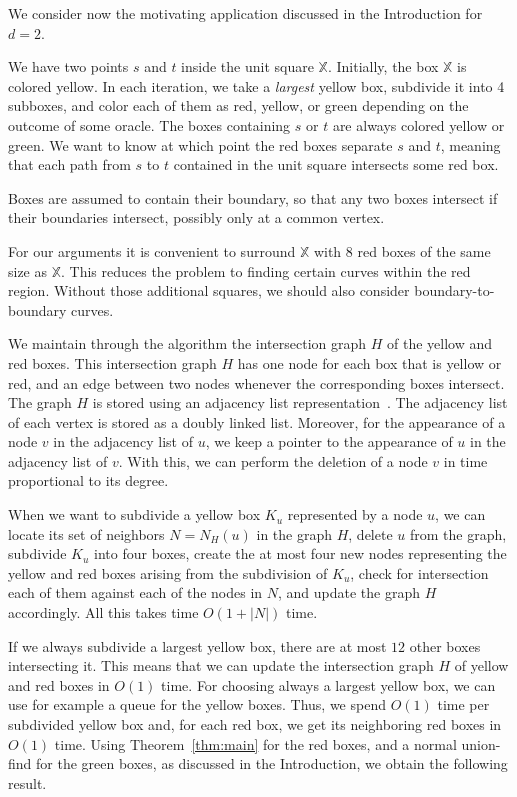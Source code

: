 \documentclass[a4paper,11pt]{article}
\newcommand{\configspace}{\mathbb{X}}
\begin{document}
We consider now the motivating application discussed in the Introduction for $d=2$.

We have two points $s$ and $t$ inside the unit square $\configspace$.
Initially, the box $\configspace$ is colored yellow.
In each iteration, we take a \emph{largest} yellow box, subdivide it into
4 subboxes, and color each of them as red, yellow, or green 
depending on the outcome of some oracle.
The boxes containing $s$ or $t$ are always colored yellow or green.
We want to know at which point the red boxes separate $s$ and $t$, meaning
that each path from $s$ to $t$ contained in the unit square 
intersects some red box. 

Boxes are assumed to contain their boundary, 
so that any two boxes intersect if their boundaries intersect, 
possibly only at a common vertex.

For our arguments it is convenient to surround $\configspace$ with 8 red boxes of the same size
as $\configspace$. This reduces the problem to finding certain
curves within the red region. Without those additional squares, we should also consider 
boundary-to-boundary curves.

We maintain through the algorithm the intersection graph $H$ of the yellow and red boxes.
This intersection graph $H$ has one node for each box that is yellow or red,
and an edge between two nodes whenever the corresponding boxes intersect.
The graph $H$ is stored using an adjacency list representation~\cite[Chapter 22]{cormen}.
The adjacency list of each vertex is stored as a doubly linked list.
Moreover, for the appearance of a node $v$ in the adjacency list of $u$,
we keep a pointer to the appearance of $u$ in the adjacency list of $v$.
With this, we can perform the deletion of a node $v$ in time proportional to its
degree.

When we want to subdivide a yellow box $K_u$ represented by a node $u$, 
we can locate its set of neighbors $N=N_H(u)$ in the graph $H$, delete $u$ from
the graph, subdivide $K_u$ into four boxes, create the at most four new nodes
representing the yellow and red boxes arising from the subdivision of $K_u$,
check for intersection each of them against each of the nodes in $N$, 
and update the graph $H$ accordingly. 
All this takes time $O(1+|N|)$ time.

If we always subdivide a largest yellow box, there are at most $12$ 
other boxes intersecting it. This means that we can update the 
intersection graph $H$ of yellow and red boxes in $O(1)$ time.
For choosing always a largest yellow box, we can use for example a queue
for the yellow boxes.
Thus, we spend $O(1)$ time per subdivided yellow box and,
for each red box, we get its neighboring red boxes in $O(1)$ time.
Using Theorem~\ref{thm:main} for the red boxes, and a normal union-find
for the green boxes, as discussed in the Introduction,
we obtain the following result.
\end{document}
